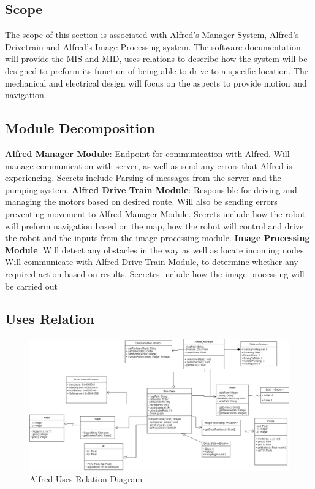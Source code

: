 \documentclass [10pt]{article}
\begin{document}
\subsection{Scope}

The scope of this section is associated with Alfred's Manager System, Alfred's Drivetrain and Alfred's Image Processing system. The software documentation will provide the MIS and MID, uses relations to describe how the system will be designed to preform its function of being able to drive to a specific location. The mechanical and electrical design will focus on the aspects to provide motion and navigation.


\subsection{Module Decomposition}

\textbf{Alfred Manager Module}: Endpoint for communication with Alfred. Will manage communication with server, as well as send any errors that Alfred is experiencing. Secrets include Parsing of messages from the server and the pumping system. 
\textbf{Alfred Drive Train Module}: Responsible for driving and managing the motors based on desired route. Will also be sending errors preventing movement to Alfred Manager Module. Secrets include how the robot will preform navigation based on the map, how the robot will control and drive the robot and the inputs from the image processing module.
\textbf{Image Processing Module}: Will detect any obstacles in the way as well as locate incoming nodes. Will communicate with Alfred Drive Train Module, to determine whether any required action based on results. Secretes include how the image processing will be carried out

\subsection{Uses Relation}
\begin{figure} [h!]
	\centering
	\includegraphics [scale = 0.4] {figures/Alfred_UsesDiagram.png}
	\caption{Alfred Uses Relation Diagram}
\end{figure}
\end{document}
